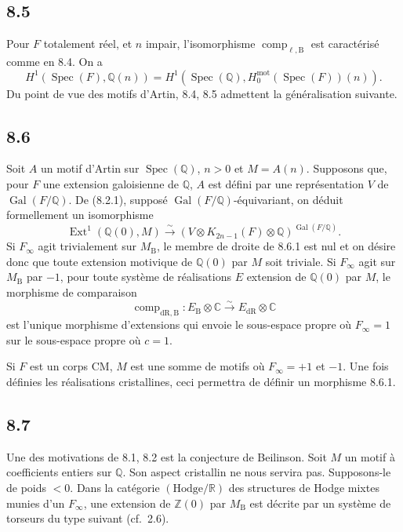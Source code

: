 \documentclass[12pt,a4paper]{article}
\theoremstyle{plain}
\theoremstyle{definition}
\theoremstyle{remark}
\DeclareMathOperator{\Spec}{Spec}
\DeclareMathOperator{\Gal}{Gal}
\DeclareMathOperator{\Ext}{Ext}
\DeclareMathOperator{\comp}{comp}
\newcommand{\DR}{\mathrm{dR}}
\newcommand{\B}{\mathrm{B}}
\newcommand{\mot}{\mathrm{mot}}
\newcommand{\Z}{\mathbb{Z}}
\newcommand{\Q}{\mathbb{Q}}
\newcommand{\C}{\mathbb{C}}
\newcommand{\R}{\mathbb{R}}
\begin{document}
\subsection*{8.5}
Pour $F$ totalement r\'eel, et $n$ impair, l'isomorphisme $\comp_{\ell,\B}$ est caract\'eris\'e comme en 8.4. On a
\begin{equation*}\tag{8.5.1}
H^1(\Spec(F), \Q(n)) = H^1(\Spec(\Q), H^{\mot}_0(\Spec(F))(n)).
\end{equation*}
Du point de vue des motifs d'Artin, 8.4, 8.5 admettent la g\'en\'eralisation suivante.

\subsection*{8.6}
Soit $A$ un motif d'Artin sur $\Spec(\Q)$, $n > 0$ et $M = A(n)$. Supposons que, pour $F$ une extension galoisienne de $\Q$, $A$ est d\'efini par une repr\'esentation $V$ de $\Gal(F/\Q)$. De (8.2.1), suppos\'e $\Gal(F/\Q)$-\'equivariant, on d\'eduit formellement un isomorphisme
\begin{equation*}\tag{8.6.1}
\Ext^1(\Q(0), M) \xrightarrow{\sim} (V \otimes K_{2n-1}(F) \otimes \Q)^{\Gal(F/\Q)}.
\end{equation*}
Si $F_\infty$ agit trivialement sur $M_\B$, le membre de droite de 8.6.1 est nul et on d\'esire donc que toute extension motivique de $\Q(0)$ par $M$ soit triviale. Si $F_\infty$ agit sur $M_\B$ par $-1$, pour toute syst\`eme de r\'ealisations $E$ extension de $\Q(0)$ par $M$, le morphisme de comparaison
\[
\comp_{\DR,\B}: E_\B \otimes \C \xrightarrow{\sim} E_\DR \otimes \C
\]
est l'unique morphisme d'extensions qui envoie le sous-espace propre o\`u $F_\infty = 1$ sur le sous-espace propre o\`u $c = 1$.

Si $F$ est un corps CM, $M$ est une somme de motifs o\`u $F_\infty = +1$ et $-1$. Une fois d\'efinies les r\'ealisations cristallines, ceci permettra de d\'efinir un morphisme 8.6.1.

\subsection*{8.7}
Une des motivations de 8.1, 8.2 est la conjecture de Beilinson. Soit $M$ un motif \`a coefficients entiers sur $\Q$. Son aspect cristallin ne nous servira pas. Supposons-le de poids $< 0$. Dans la cat\'egorie $(\mathrm{Hodge}/\R)$ des structures de Hodge mixtes munies d'un $F_\infty$, une extension de $\Z(0)$ par $M_\B$ est d\'ecrite par un syst\`eme de torseurs du type suivant (cf.~2.6).
\end{document}

